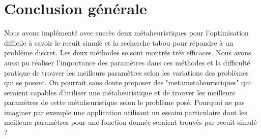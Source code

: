 \documentclass{report}
\begin{document}
\chapter{Conclusion générale}
Nous avons implémenté avec succès deux métaheuristiques pour l'optimisation difficile à savoir le recuit simulé et la recherche tabou pour répondre à un problème discret. Les deux méthodes se sont montrés très efficaces. Nous avons aussi pu réaliser l'importance des paramètres dans ces méthodes et la difficulté pratique de trouver les meilleurs paramètres selon les variations des problèmes qui se posent. On pourrait sans doute proposer des "metametaheuristiques" qui seraient capables d’utiliser une métaheuristique et de trouver
les meilleurs paramètres de cette métaheuristique selon le problème posé. Pourquoi
ne pas imaginer par exemple une application utilisant un essaim particulaire dont les
meilleurs paramètres pour une fonction donnée seraient trouvés par recuit simulé ?
\end{document}
